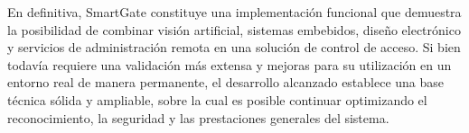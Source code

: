 En definitiva, SmartGate constituye una implementación funcional que demuestra la posibilidad de combinar visión artificial, sistemas embebidos, diseño electrónico y servicios de administración remota en una solución de control de acceso. Si bien todavía requiere una validación más extensa y mejoras para su utilización en un entorno real de manera permanente, el desarrollo alcanzado establece una base técnica sólida y ampliable, sobre la cual es posible continuar optimizando el reconocimiento, la seguridad y las prestaciones generales del sistema.
